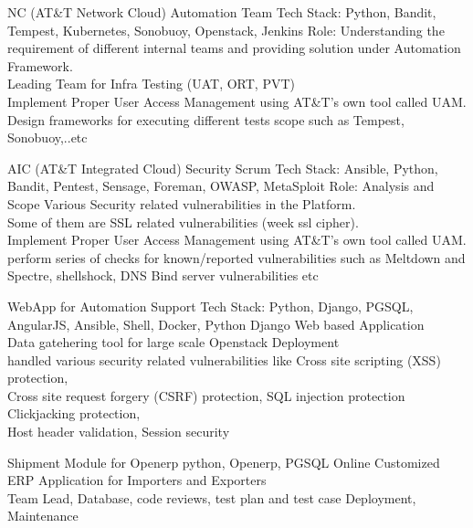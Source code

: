 
\begin{projectentries}

\projectentry
{NC (AT\&T Network Cloud) Automation Team} %
{Tech Stack: Python, Bandit, Tempest, Kubernetes, Sonobuoy, Openstack, Jenkins}
{Role: Understanding the requirement of different internal teams and providing solution under Automation Framework.
\\ Leading Team for Infra Testing (UAT, ORT, PVT)
\\ Implement Proper User Access Management using AT\&T’s own tool called UAM. \\Design frameworks for executing different tests scope such as Tempest, Sonobuoy,..etc}

\projectentry
{AIC (AT\&T Integrated Cloud) Security Scrum} %
{Tech Stack: Ansible, Python, Bandit, Pentest, Sensage, Foreman,
OWASP, MetaSploit}
{Role: Analysis and Scope Various Security related vulnerabilities in the
Platform. \\ Some of them are SSL related vulnerabilities (week ssl cipher).
\\ Implement Proper User Access Management using AT\&T’s own tool
called UAM. \\perform series of checks for known/reported vulnerabilities
such as Meltdown and Spectre, shellshock, DNS Bind server
vulnerabilities etc}

\projectentry
{WebApp for Automation Support} %
{Tech Stack: Python, Django, PGSQL, AngularJS, Ansible, Shell, Docker,}
{Python Django Web based Application \\
Data gatehering tool for large scale Openstack Deployment \\
handled various security related vulnerabilities like Cross site scripting (XSS) protection,
\\ Cross site request forgery (CSRF) protection, SQL injection protection Clickjacking protection,
\\ Host header validation, Session security
}

\projectentry
{Shipment Module for Openerp} %
{python, Openerp, PGSQL}
{ Online Customized ERP Application for Importers and Exporters \\
Team Lead, Database, code reviews, test plan and test case Deployment, Maintenance
}

\end{projectentries}